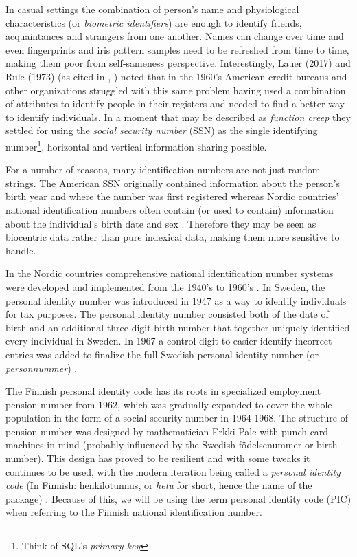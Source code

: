 In casual settings the combination of person's name and physiological characteristics (or \emph{biometric identifiers}) are enough to identify friends, acquaintances and strangers from one another. Names can change over time and even fingerprints and iris pattern samples need to be refreshed from time to time, making them poor from self-sameness perspective. Interestingly, Lauer (2017) and Rule (1973) (as cited in \citeauthor{brensinger2021}, \citeyear[31--32]{brensinger2021}) noted that in the 1960's American credit bureaus and other organizations struggled with this same problem having used a combination of attributes to identify people in their registers and needed to find a better way to identify individuals. In a moment that may be described as \emph{function creep} they settled for using the \emph{social security number} (SSN) as the single identifying number\footnote{Think of SQL's \emph{primary key}}, horizontal and vertical information sharing possible.

For a number of reasons, many identification numbers are not just random strings. The American SSN originally contained information about the person's birth year and where the number was first registered \citep[32]{brensinger2021} whereas Nordic countries' national identification numbers often contain (or used to contain) information about the individual's birth date and sex \citep{watson2010, salste2021}. Therefore they may be seen as biocentric data rather than pure indexical data, making them more sensitive to handle.

In the Nordic countries comprehensive national identification number systems were developed and implemented from the 1940's to 1960's \citep{watson2010}. In Sweden, the personal identity number was introduced in 1947 as a way to identify individuals for tax purposes. The personal identity number consisted both of the date of birth and an additional three-digit birth number that together uniquely identified every individual in Sweden. In 1967 a control digit to easier identify incorrect entries was added to finalize the full Swedish personal identity number (or \emph{personnummer}) \citep{johansson2003,scb2016}.

The Finnish personal identity code has its roots in specialized employment pension number from 1962, which was gradually expanded to cover the whole population in the form of a social security number in 1964-1968. The structure of pension number was designed by mathematician Erkki Pale with punch card machines in mind (probably influenced by the Swedish födelsenummer or birth number). This design has proved to be resilient and with some tweaks it continues to be used, with the modern iteration being called a \emph{personal identity code} (In Finnish: henkilötunnus, or \emph{hetu} for short, hence the name of the package) \citep{salste2021}. Because of this, we will be using the term personal identity code (PIC) when referring to the Finnish national identification number.

